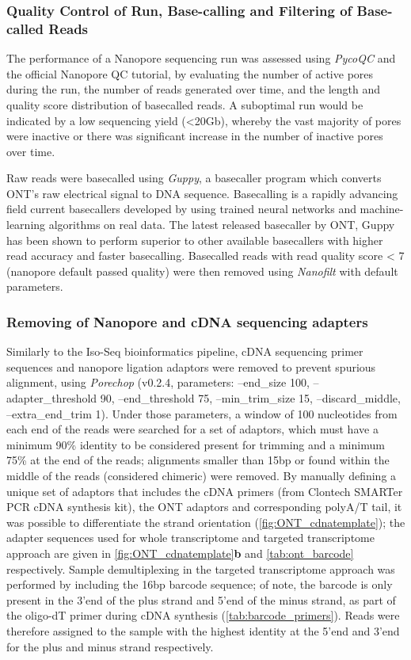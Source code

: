 \subsubsection{Quality Control of Run, Base-calling and Filtering of Base-called Reads}
The performance of a Nanopore sequencing run was assessed using \textit{PycoQC}\cite{Leger2019} and the official Nanopore QC tutorial\cite{ONT2019NanoporeQC}, by evaluating the number of active pores during the run, the number of reads generated over time, and the length and quality score distribution of basecalled reads. A suboptimal run would be indicated by a low sequencing yield (<20Gb), whereby the vast majority of pores were inactive or there was significant increase in the number of inactive pores over time. 

Raw reads were basecalled using \textit{Guppy}, a basecaller program which converts ONT's raw electrical signal to DNA sequence. Basecalling is a rapidly advancing field current basecallers developed by using trained neural networks and machine-learning algorithms on real data\cite{Wick2019}. The latest released basecaller by ONT, Guppy has been shown to perform superior to other available basecallers with higher read accuracy and faster basecalling\cite{Wick2019}. Basecalled reads with read quality score < 7 (nanopore default passed quality) were then removed using \textit{Nanofilt}\cite{DeCoster2018} with default parameters. 

\subsubsection{Removing of Nanopore and cDNA sequencing adapters}
Similarly to the Iso-Seq bioinformatics pipeline, cDNA sequencing primer sequences and nanopore ligation adaptors were removed to prevent spurious alignment, using \textit{Porechop}\cite{Wick2017} (v0.2.4, parameters: --end\_size 100, --adapter\_threshold 90, --end\_threshold 75, --min\_trim\_size 15, --discard\_middle, --extra\_end\_trim 1). Under those parameters, a window of 100 nucleotides from each end of the reads were searched for a set of adaptors, which must have a minimum 90\% identity to be considered present for trimming and a minimum 75\% at the end of the reads; alignments smaller than 15bp or found within the middle of the reads (considered chimeric) were removed. By manually defining a unique set of adaptors that includes the cDNA primers (from Clontech SMARTer PCR cDNA synthesis kit), the ONT adaptors and corresponding polyA/T tail, it was possible to differentiate the strand orientation (\cref{fig:ONT_cdnatemplate}); the adapter sequences used for whole transcriptome and targeted transcriptome approach are given in \cref{fig:ONT_cdnatemplate}\textbf{b} and \cref{tab:ont_barcode} respectively. Sample demultiplexing in the targeted transcriptome approach was performed by including the 16bp barcode sequence; of note, the barcode is only present in the 3'end of the plus strand and 5'end of the minus strand, as part of the oligo-dT primer during cDNA synthesis (\cref{tab:barcode_primers}). Reads were therefore assigned to the sample with the highest identity at the 5'end and 3'end for the plus and minus strand respectively. 


